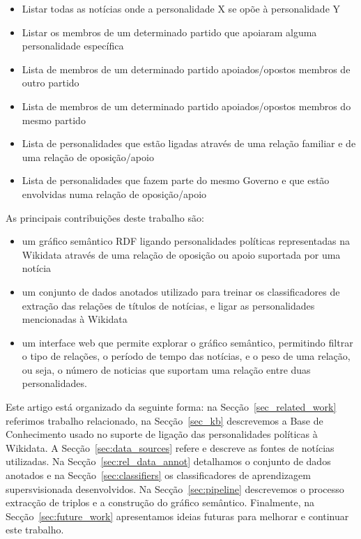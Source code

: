 \documentclass[a4paper, twocolumn, 11pt, twoside]{article}
\begin{document}
\begin{itemize}
\item{Listar todas as notícias onde a personalidade X se opõe à personalidade Y}
\item{Listar os membros de um determinado partido que apoiaram alguma personalidade específica}
\item{Lista de membros de um determinado partido apoiados/opostos membros de outro partido}
\item{Lista de membros de um determinado partido apoiados/opostos membros do mesmo partido}
\item{Lista de personalidades que estão ligadas através de uma relação familiar e de uma relação de oposição/apoio}
\item{Lista de personalidades que fazem parte do mesmo Governo e que estão envolvidas numa relação de oposição/apoio}
\end{itemize}

As principais contribuições deste trabalho são: 

\begin{itemize}
\item{um gráfico semântico RDF ligando personalidades políticas representadas na Wikidata através de uma relação de oposição ou apoio suportada por uma notícia}
\item{um conjunto de dados anotados utilizado para treinar os classificadores de extração das relações de títulos de notícias, e ligar as personalidades mencionadas à Wikidata}
\item{um interface web que permite explorar o gráfico semântico, permitindo filtrar o tipo de relações, o período de tempo das notícias, e o peso de uma relação, ou seja, o número de noticias que suportam uma relação entre duas personalidades.}
\end{itemize}

Este artigo está organizado da seguinte forma: na Secção~\ref{sec_related_work} referimos trabalho relacionado, na Secção~\ref{sec_kb} descrevemos a Base de Conhecimento usado no suporte de ligação das personalidades políticas à Wikidata. A Secção~\ref{sec:data_sources} refere e descreve as fontes de notícias utilizadas. Na Secção~\ref{sec:rel_data_annot} detalhamos o conjunto de dados anotados e na Secção~\ref{sec:classifiers} os classificadores de aprendizagem supersvisionada desenvolvidos. Na Secção~\ref{sec:pipeline} descrevemos o processo extracção de triplos e a construção do gráfico semântico. Finalmente, na Secção~\ref{sec:future_work} apresentamos ideias futuras para melhorar e continuar este trabalho.
\end{document}

